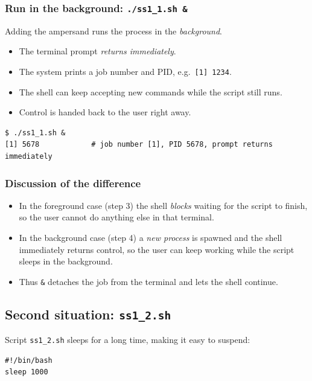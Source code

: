 \documentclass[11pt,a4paper]{article}
\begin{document}
\subsubsection*{Run in the background: \texttt{./ss1\_1.sh \&}}
Adding the ampersand runs the process in the \emph{background}.
\begin{itemize}[leftmargin=2em]
  \item The terminal prompt \emph{returns immediately}.
  \item The system prints a job number and PID, e.g.\ \texttt{[1] 1234}.
  \item The shell can keep accepting new commands while the script still runs.
  \item Control is handed back to the user right away.
\end{itemize}

\begin{lstlisting}[style=bashstyle]
$ ./ss1_1.sh &
[1] 5678            # job number [1], PID 5678, prompt returns immediately
\end{lstlisting}

\subsubsection*{Discussion of the difference}
\begin{itemize}[leftmargin=2em]
  \item In the foreground case (step 3) the shell \emph{blocks} waiting for the script to
        finish, so the user cannot do anything else in that terminal.
  \item In the background case (step 4) a \emph{new process} is spawned and the shell
        immediately returns control, so the user can keep working while the script sleeps in
        the background.
  \item Thus \texttt{\&} detaches the job from the terminal and lets the shell continue.
\end{itemize}

\subsection{Second situation: \texttt{ss1\_2.sh}}

Script \texttt{ss1\_2.sh} sleeps for a long time, making it easy to suspend:

\begin{lstlisting}[style=bashstyle]
#!/bin/bash
sleep 1000
\end{lstlisting}
\end{document}

